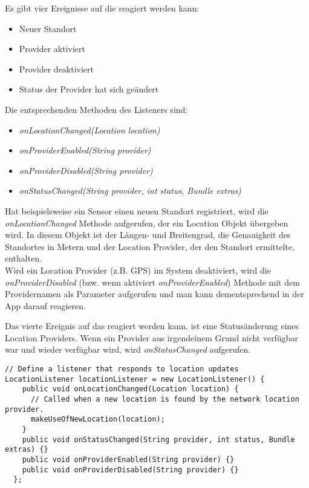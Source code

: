 Es gibt vier Ereignisse auf die reagiert werden kann:
\begin{itemize}
     \item Neuer Standort
     \item Provider aktiviert
     \item Provider deaktiviert
     \item Status der Provider hat sich geändert
\end{itemize}
Die entsprechenden Methoden des Listeners sind:
\begin{itemize}
     \item \textit{onLocationChanged(Location location)}
     \item \textit{onProviderEnabled(String provider)}
     \item \textit{onProviderDisabled(String provider)}
     \item \textit{onStatusChanged(String provider, int status, Bundle extras)}
\end{itemize}
Hat beispielsweise ein Sensor einen neuen Standort registriert, wird die \textit{onLocationChanged} Methode aufgerufen, der ein Location Objekt übergeben wird. In diesem Objekt ist der Längen- und Breitengrad, die Genauigkeit des Standortes in Metern und der Location Provider, der den Standort ermittelte, enthalten. 
\\
Wird ein Location Provider (z.B. GPS) im System deaktiviert, wird die \textit{onProviderDisabled} (bzw. wenn aktiviert \textit{onProviderEnabled}) Methode mit dem Providernamen als Parameter aufgerufen und man kann dementsprechend in der App darauf reagieren. 

\newpage
Das vierte Ereignis auf das reagiert werden kann, ist eine Statusänderung eines Location Providers. Wenn ein Provider aus irgendeinem Grund nicht verfügbar war und wieder verfügbar wird, wird \textit{onStatusChanged} aufgerufen.

\begin{lstlisting}[caption={LocationListener},label=lst:locationListener]
// Define a listener that responds to location updates
LocationListener locationListener = new LocationListener() {
    public void onLocationChanged(Location location) {
      // Called when a new location is found by the network location provider.
      makeUseOfNewLocation(location);
    }
    public void onStatusChanged(String provider, int status, Bundle extras) {}
    public void onProviderEnabled(String provider) {}
    public void onProviderDisabled(String provider) {}
  };
\end{lstlisting}

